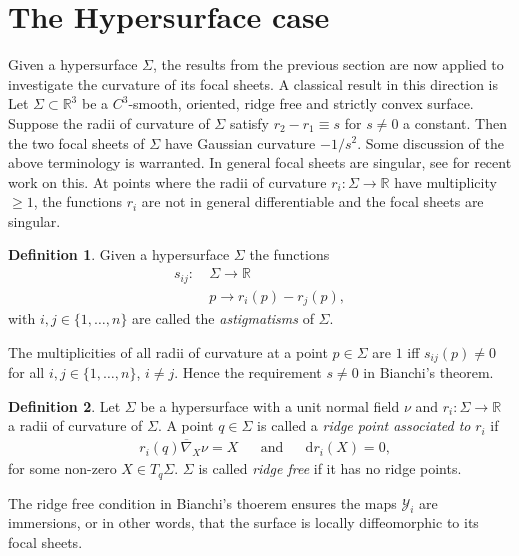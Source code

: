 \documentclass[12pt]{amsart}
\theoremstyle{plain}
\newenvironment{Manualthm}[1]{%
  \IfBlankTF{#1}
    {\renewcommand{\theManualthminner}{\unskip}}
    {\renewcommand\theManualthminner{#1}}%
  \Manualthminner
}{\endManualthminner}
\theoremstyle{definition}
\newtheorem{Def}{Definition}
\def\R{\mathbb{R}}
\newcommand{\td}{\mathrm{d}}
\numberwithin{equation}{section}
\begin{document}
\section{The Hypersurface case}\label{sec: the focal sets of hypersurfaces}
Given a hypersurface $\Sigma$, the results from the previous section are now applied to investigate the curvature of its focal sheets. A classical result in this direction is
\begin{Manualthm}{A}[Bianchi, 1874] \label{Bianchi thm}\cite{B1874}
Let $\Sigma\subset\mathbb{R}^3$ be a $C^3$-smooth, oriented, ridge free and strictly convex surface. Suppose the radii of curvature of $\Sigma$ satisfy $r_2-r_1 \equiv s$ for $s\neq0$ a constant. Then the two focal sheets of $\Sigma$ have Gaussian curvature $-1/s^2$.
\end{Manualthm}
Some discussion of the above terminology is warranted. In general focal sheets are singular, see \cite{BT23} for recent work on this. At points where the radii of curvature $r_i:\Sigma\to\R$ have multiplicity $\geq1$, the functions $r_i$ are not in general differentiable and the focal sheets are singular.
\begin{Def}
    Given a hypersurface $\Sigma$ the functions
\begin{align*}
        s_{ij}:~&\Sigma \to \R\\
        &p \to r_i(p)-r_j(p),
\end{align*}
with $i,j\in\{1,\ldots,n\}$ are called the \textit{astigmatisms} of $\Sigma$.
\end{Def}
The multiplicities of all radii of curvature at a point $p\in \Sigma$ are $1$ iff $s_{ij}(p)\neq 0$ for all $i,j\in\{1,\ldots,n\}$, $i\neq j$. Hence the requirement $s\neq0$ in Bianchi's theorem.
\begin{Def} Let $\Sigma$ be a hypersurface with a unit normal field $\nu$ and $r_i:\Sigma\to \R$ a radii of curvature of $\Sigma$. A point $q\in\Sigma$ is called a \textit{ridge point associated to} $r_i$ \cite{Port94} if
    \begin{align}\label{eq: ridge condition}
        &r_i(q)\overline{\nabla}_X \nu=X &&\text{and} &&\td r_i(X)=0,
    \end{align}
    for some non-zero $X\in T_q\Sigma$. $\Sigma$ is called \textit{ridge free} if it has no ridge points.
\end{Def}
The ridge free condition in Bianchi's thoerem ensures the maps $\mathcal{Y}_i$ are immersions, or in other words, that the surface is locally diffeomorphic to its focal sheets.
\end{document}

